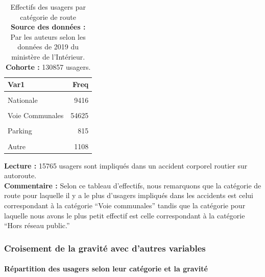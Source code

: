 \documentclass[french,]{tp}
\let\oldparagraph\paragraph
\renewcommand{\paragraph}[1]{\oldparagraph{#1}\mbox{}}
\begin{document}
\begin{table}[H]

\caption{\label{tab:tablecatr}Effectifs des usagers par catégorie de route\\
\textbf{Source des données :} Par les auteurs selon les données de 2019 du ministère de l'Intérieur.\\
\textbf{Cohorte :} 130857 usagers.\\}
\centering
\begin{tabular}[t]{lr}
\toprule
\textbf{Var1} & \textbf{Freq}\\
\midrule
\cellcolor{gray!6}{Autoroute} & \cellcolor{gray!6}{15765}\\
Nationale & 9416\\
\cellcolor{gray!6}{Départementale} & \cellcolor{gray!6}{46099}\\
Voie Communales & 54625\\
\cellcolor{gray!6}{Hors réseau public} & \cellcolor{gray!6}{131}\\
\addlinespace
Parking & 815\\
\cellcolor{gray!6}{Route metropole urbaine} & \cellcolor{gray!6}{2898}\\
Autre & 1108\\
\bottomrule
\end{tabular}
\end{table}

\textbf{Lecture :} 15765 usagers sont impliqués dans un accident corporel routier sur autoroute.\\
\textbf{Commentaire :} Selon ce tableau d'effectifs, nous remarquons que la catégorie de route pour laquelle il y a le plus d'usagers impliqués dans les accidents est celui correspondant à la catégorie ``Voie communales'' tandis que la catégorie pour laquelle nous avons le plus petit effectif est celle correspondant à la catégorie ``Hors réseau public.''

\newpage

\hypertarget{crois-grav}{%
\subsubsection{Croisement de la gravité avec d'autres variables}\label{crois-grav}}

\hypertarget{ruxe9partition-des-usagers-selon-leur-catuxe9gorie-et-la-gravituxe9}{%
\paragraph{Répartition des usagers selon leur catégorie et la gravité}\label{ruxe9partition-des-usagers-selon-leur-catuxe9gorie-et-la-gravituxe9}}
\end{document}
